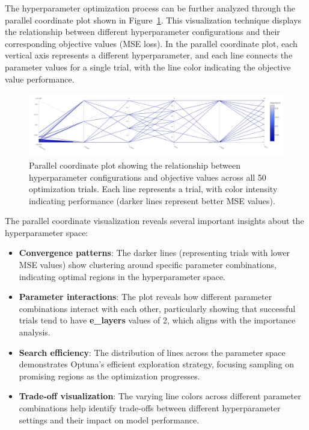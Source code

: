 The hyperparameter optimization process can be further analyzed through the parallel coordinate plot shown in Figure~\ref{fig:parallel_coordinates}. This visualization technique displays the relationship between different hyperparameter configurations and their corresponding objective values (MSE loss). In the parallel coordinate plot, each vertical axis represents a different hyperparameter, and each line connects the parameter values for a single trial, with the line color indicating the objective value performance.

\begin{figure}[htbp]
    \centering
    \includegraphics[width=1.0\textwidth]{imgs/objective_parallel_coordinate.png}
    \caption{Parallel coordinate plot showing the relationship between hyperparameter configurations and objective values across all 50 optimization trials. Each line represents a trial, with color intensity indicating performance (darker lines represent better MSE values).}
    \label{fig:parallel_coordinates}
\end{figure}

The parallel coordinate visualization reveals several important insights about the hyperparameter space:

\begin{itemize}
    \item \textbf{Convergence patterns}: The darker lines (representing trials with lower MSE values) show clustering around specific parameter combinations, indicating optimal regions in the hyperparameter space.
    \item \textbf{Parameter interactions}: The plot reveals how different parameter combinations interact with each other, particularly showing that successful trials tend to have \textbf{e\_layers} values of 2, which aligns with the importance analysis.
    \item \textbf{Search efficiency}: The distribution of lines across the parameter space demonstrates Optuna's efficient exploration strategy, focusing sampling on promising regions as the optimization progresses.
    \item \textbf{Trade-off visualization}: The varying line colors across different parameter combinations help identify trade-offs between different hyperparameter settings and their impact on model performance.
\end{itemize}

